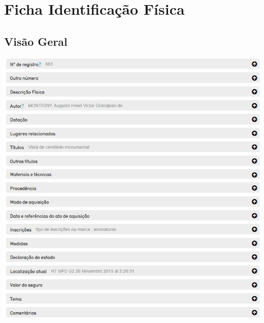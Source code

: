 
\lstset{language=XML}


\section{Ficha Identificação Física}
\subsection{Visão Geral}
\begin{flushleft}
	\includegraphics[width=\linewidth]{fichaId-01}
\end{flushleft}
%	
